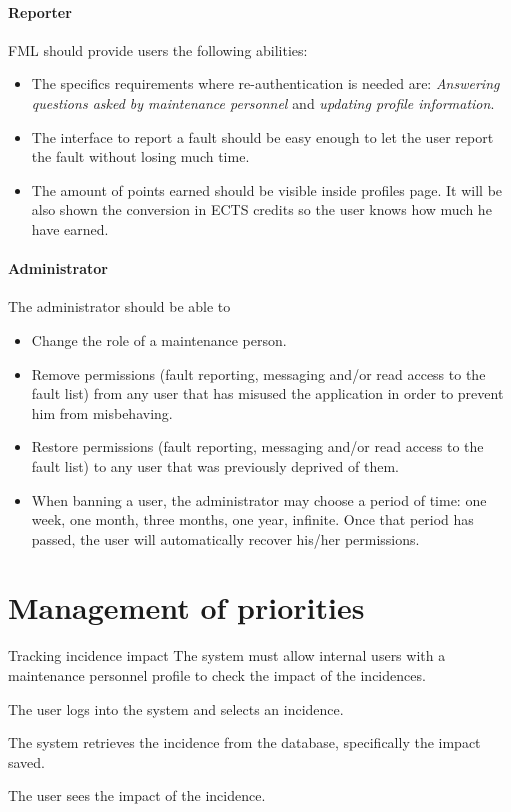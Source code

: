 \paragraph{Reporter} FML should provide users the following abilities:
\begin{itemize}
\item The specifics requirements where re-authentication is needed are: \textit{Answering questions asked by maintenance personnel}   \label{Specifics_Secure_Requirements_for_user} and \textit{updating profile information}.
\item The interface to report a fault should be easy enough to let the user report the fault without losing much time.
\item The amount of points earned should be visible inside profiles page. It will be also shown the conversion in ECTS credits so the user knows how much he have earned.

\end{itemize}

\paragraph{Administrator} The administrator should be able to

\begin{itemize}
\item Change the role of a maintenance person.
\item Remove permissions (fault reporting, messaging and/or read access to the fault list) from any user that has misused the application in order to prevent him from misbehaving.
\item Restore permissions (fault reporting, messaging and/or read access to the fault list) to any user that was previously deprived of them.
\item When banning a user, the administrator may choose a period of time: one week, one month, three months, one year, infinite. Once that period has passed, the user will automatically recover his/her permissions.
\end{itemize}

\section{Management of priorities}

\begin{requirement}{Tracking incidence impact}
\reqdesc The system must allow internal users with a maintenance personnel profile to check the impact of the incidences.

\reqin The user logs into the system and selects an incidence.

\reqsteps The system retrieves the incidence from the database, specifically the impact saved.

\reqout The user sees the impact of the incidence.
\end{requirement}


